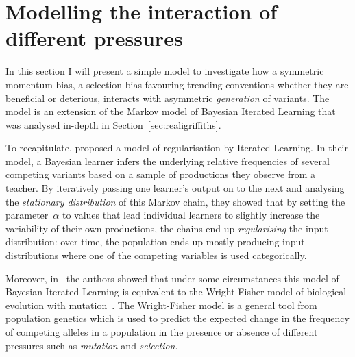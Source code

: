 \section{Modelling the interaction of different pressures}
\label{sec:asymmetricvariation}


In this section I will present a simple model to investigate how a symmetric momentum bias, a selection bias favouring trending conventions whether they are beneficial or deterious, interacts with asymmetric \emph{generation} of variants. The model is an extension of the Markov model of Bayesian Iterated Learning that was analysed in-depth in Section~\ref{sec:realigriffiths}.

To recapitulate, \citet{Reali2009} proposed a model of regularisation by Iterated Learning. In their model, a Bayesian learner infers the underlying relative frequencies of several competing variants based on a sample of productions they observe from a teacher. By iteratively passing one learner's output on to the next and analysing the \emph{stationary distribution} of this Markov chain, they showed that by setting the parameter~$\alpha$ to values that lead individual learners to slightly increase the variability of their own productions, the chains end up \emph{regularising} the input distribution: over time, the population ends up mostly producing input distributions where one of the competing variables is used categorically.

Moreover, in~\citet{Reali2010} the authors showed that under some circumstances this model of Bayesian Iterated Learning is equivalent to the Wright-Fisher model of biological evolution with mutation~\citep[see e.g.][]{Hartl2007}.
The Wright-Fisher model is a general tool from population genetics which is used to predict the expected change in the frequency of competing alleles in a population in the presence or absence of different pressures such as \emph{mutation} and \emph{selection}.


